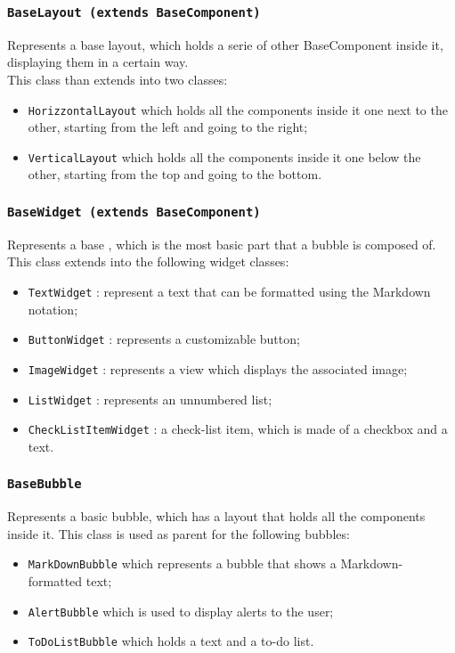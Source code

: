 \subsubsection{\texttt{BaseLayout (extends BaseComponent)}}
Represents a base layout, which holds a serie of other BaseComponent inside it, displaying them in a certain way. \\
This class than extends into two classes:
\begin{itemize}
	\item \texttt{HorizzontalLayout} which holds all the components inside it one next to the other, starting from the left and going to the right;
	\item \texttt{VerticalLayout} which holds all the components inside it one below the other, starting from the top and going to the bottom.
\end{itemize}


\subsubsection{\texttt{BaseWidget (extends BaseComponent)}}
Represents a base , which is the most basic part that a bubble is composed of.
This class extends into the following widget classes:
\begin{itemize}
	\item \texttt{TextWidget} : represent a text that can be formatted using the Markdown notation;
	\item \texttt{ButtonWidget} : represents a customizable button;
	\item \texttt{ImageWidget} : represents a view which displays the associated image;
	\item \texttt{ListWidget} : represents an unnumbered list;
	\item \texttt{CheckListItemWidget} : a check-list item, which is made of a checkbox and a text.
\end{itemize}

\subsubsection{\texttt{BaseBubble}}
Represents a basic bubble, which has a layout that holds all the components inside it.
This class is used as parent for the following bubbles:
\begin{itemize}
	\item \texttt{MarkDownBubble} which represents a bubble that shows a Markdown-formatted text;
	\item \texttt{AlertBubble} which is used to display alerts to the user;
	\item \texttt{ToDoListBubble} which holds a text and a to-do list.
\end{itemize}

\newpage






